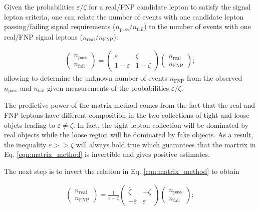 Given the probabilities $\varepsilon/\zeta$ for a real/FNP candidate lepton to satisfy the signal lepton criteria, 
one can relate the number of events with one candidate lepton passing/failing signal requirements ($n_\text{pass}/n_\text{fail}$) to the number of events with one real/FNP signal leptons ($n_\text{real}/n_\text{FNP}$):

\begin{align}
\begin{pmatrix}n_\text{pass}\\n_\text{fail}\end{pmatrix} 
= \begin{pmatrix}\varepsilon & \zeta\\ 1-\varepsilon & 1-\zeta\end{pmatrix}
\begin{pmatrix}n_\text{real}\\n_\text{FNP}\end{pmatrix}; 
\label{eqn:matrix_method}
\end{align}
allowing to determine the unknown number of events $n_\text{FNP}$ from the observed $n_\text{pass}$ and $n_\text{fail}$ given measurements of the 
probabilities $\varepsilon/\zeta$. 

The predictive power of the matrix method comes from the fact that 
the real and FNP leptons have different composition in the two collections 
of tight and loose objets leading to $\varepsilon \neq \zeta$. In fact, 
the tight lepton collection will be dominated by real objects while the 
loose region will be dominated by fake objects. As a result, 
the inequality $\varepsilon >> \zeta$ will always hold true which 
guarantees that the martrix in Eq. \ref{eqn:matrix_method} is invertible 
and gives positive estimates. 

The next step is to invert the relation in Eq. \ref{eqn:matrix_method} to 
obtain

\begin{align}
\begin{pmatrix}n_\text{real}\\n_\text{FNP}\end{pmatrix} 
= \frac{1}{\varepsilon - \zeta} \begin{pmatrix}\bar\zeta & -\zeta\\ -\bar\varepsilon & \varepsilon\end{pmatrix}
\begin{pmatrix}n_\text{pass}\\n_\text{fail}\end{pmatrix}; 
\label{eqn:fake.inv_matrix_method}
\end{align}

